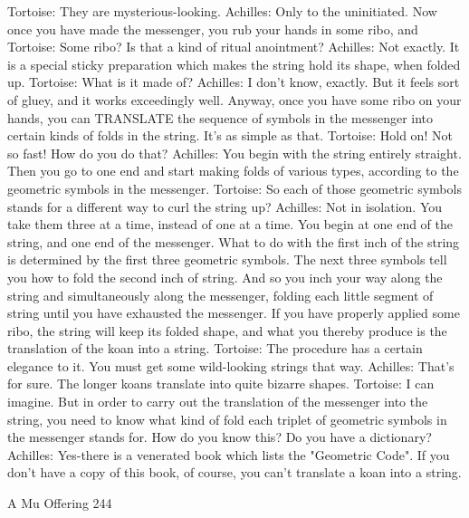 Tortoise: They are mysterious-looking.
Achilles: Only to the uninitiated. Now once you have made the messenger, you rub your
   hands in some ribo, and
Tortoise: Some ribo? Is that a kind of ritual anointment?
Achilles: Not exactly. It is a special sticky preparation which makes the string hold its
   shape, when folded up. Tortoise: What is it made of?
Achilles: I don't know, exactly. But it feels sort of gluey, and it works exceedingly well.
   Anyway, once you have some ribo on your hands, you can TRANSLATE the
   sequence of symbols in the messenger into certain kinds of folds in the string. It's as
   simple as that. Tortoise: Hold on! Not so fast! How do you do that?
Achilles: You begin with the string entirely straight. Then you go to one end and start
   making folds of various types, according to the geometric symbols in the messenger.
Tortoise: So each of those geometric symbols stands for a different way to curl the string
   up?
Achilles: Not in isolation. You take them three at a time, instead of one at a time. You
   begin at one end of the string, and one end of the messenger. What to do with the first
   inch of the string is determined by the first three geometric symbols. The next three
   symbols tell you how to fold the second inch of string. And so you inch your way
   along the string and simultaneously along the messenger, folding each little segment
   of string until you have exhausted the messenger. If you have properly applied some
   ribo, the string will keep its folded shape, and what you thereby produce is the
   translation of the koan into a string.
Tortoise: The procedure has a certain elegance to it. You must get some wild-looking
   strings that way.
Achilles: That's for sure. The longer koans translate into quite bizarre shapes.
Tortoise: I can imagine. But in order to carry out the translation of the messenger into the
   string, you need to know what kind of fold each triplet of geometric symbols in the
   messenger stands for. How do you know this? Do you have a dictionary?
Achilles: Yes-there is a venerated book which lists the "Geometric Code". If you don't
   have a copy of this book, of course, you can't translate a koan into a string.




A Mu Offering                                                                           244

